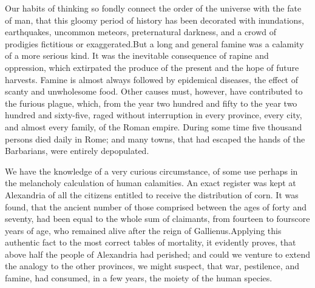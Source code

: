 


Our habits of thinking so fondly connect the order of the
universe with the fate of man, that this gloomy period of history
has been decorated with inundations, earthquakes, uncommon
meteors, preternatural darkness, and a crowd of prodigies
fictitious or exaggerated.\footnotemark[180] But a long and general famine was
a calamity of a more serious kind. It was the inevitable
consequence of rapine and oppression, which extirpated the
produce of the present and the hope of future harvests. Famine is
almost always followed by epidemical diseases, the effect of
scanty and unwholesome food. Other causes must, however, have
contributed to the furious plague, which, from the year two
hundred and fifty to the year two hundred and sixty-five, raged
without interruption in every province, every city, and almost
every family, of the Roman empire. During some time five thousand
persons died daily in Rome; and many towns, that had escaped the
hands of the Barbarians, were entirely depopulated.\footnotemark[181]



We have the knowledge of a very curious circumstance, of some use
perhaps in the melancholy calculation of human calamities. An
exact register was kept at Alexandria of all the citizens
entitled to receive the distribution of corn. It was found, that
the ancient number of those comprised between the ages of forty
and seventy, had been equal to the whole sum of claimants, from
fourteen to fourscore years of age, who remained alive after the
reign of Gallienus.\footnotemark[182] Applying this authentic fact to the most
correct tables of mortality, it evidently proves, that above half
the people of Alexandria had perished; and could we venture to
extend the analogy to the other provinces, we might suspect, that
war, pestilence, and famine, had consumed, in a few years, the
moiety of the human species.\footnotemark[183]



